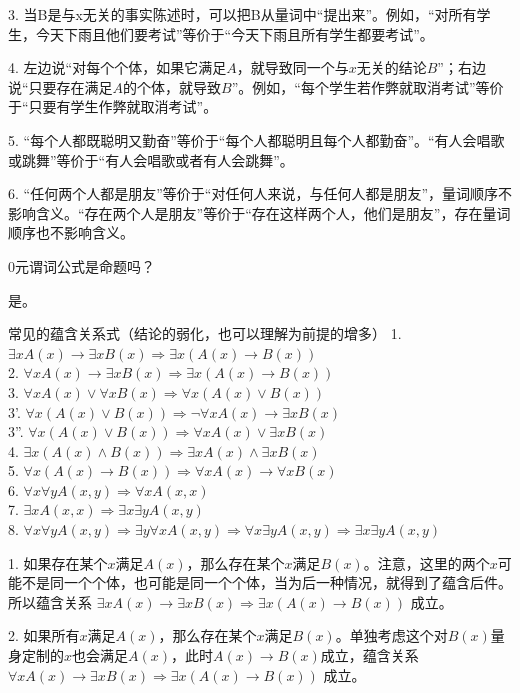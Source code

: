 \documentclass[lang=cn,11pt]{elegantbook}
\begin{document}
3. 当B是与x无关的事实陈述时，可以把B从量词中“提出来”。例如，“对所有学生，今天下雨且他们要考试”等价于“今天下雨且所有学生都要考试”。

4. 左边说“对每个个体，如果它满足$A$，就导致同一个与$x$无关的结论$B$”；右边说“只要存在满足$A$的个体，就导致$B$”。例如，“每个学生若作弊就取消考试”等价于“只要有学生作弊就取消考试”。

5. “每个人都既聪明又勤奋”等价于“每个人都聪明且每个人都勤奋”。“有人会唱歌或跳舞”等价于“有人会唱歌或者有人会跳舞”。

6. “任何两个人都是朋友”等价于“对任何人来说，与任何人都是朋友”，量词顺序不影响含义。“存在两个人是朋友”等价于“存在这样两个人，他们是朋友”，存在量词顺序也不影响含义。
\begin{example}
    0元谓词公式是命题吗？
\end{example}
是。
\begin{theorem}{常见的蕴含关系式（结论的弱化，也可以理解为前提的增多）}
1. $\exists xA(x)\to\exists xB(x)\Rightarrow\exists x(A(x)\to B(x))$\\
2. $\forall xA(x)\to \exists xB(x)\Rightarrow \exists x(A(x)\to B(x))$\\
3. $\forall xA(x)\lor \forall xB(x)\Rightarrow \forall x(A(x)\lor B(x))$\\
3'. $\forall x(A(x)\lor B(x))\Rightarrow \neg\forall xA(x)\to\exists xB(x)$\\
3''. $\forall x(A(x)\lor B(x))\Rightarrow \forall xA(x)\lor \exists xB(x)$\\
4. $\exists x(A(x)\land B(x))\Rightarrow \exists xA(x)\land \exists xB(x)$\\
5. $\forall x(A(x)\to B(x))\Rightarrow \forall xA(x)\to \forall xB(x)$\\
6. $\forall x\forall yA(x,y)\Rightarrow \forall xA(x,x)$\\
7. $\exists xA(x,x)\Rightarrow \exists x\exists yA(x,y)$\\
8. $\forall x\forall yA(x,y)\Rightarrow \exists y\forall xA(x,y)\Rightarrow \forall x\exists yA(x,y)\Rightarrow \exists x\exists yA(x,y)$
\end{theorem}
1. 如果存在某个$x$满足$A(x)$，那么存在某个$x$满足$B(x)$。注意，这里的两个$x$可能不是同一个个体，也可能是同一个个体，当为后一种情况，就得到了蕴含后件。所以蕴含关系 $\exists xA(x)\to\exists xB(x)\Rightarrow\exists x(A(x)\to B(x))$ 成立。

2. 如果所有$x$满足$A(x)$，那么存在某个$x$满足$B(x)$。单独考虑这个对$B(x)$量身定制的$x$也会满足$A(x)$，此时$A(x)\to B(x)$成立，蕴含关系 $\forall xA(x)\to \exists xB(x)\Rightarrow \exists x(A(x)\to B(x))$ 成立。
\end{document}
